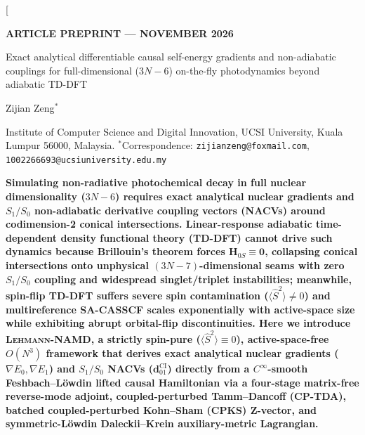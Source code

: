 \documentclass[10pt,twocolumn]{article}
\theoremstyle{natthm}
\newcommand{\leh}{\textsc{Lehmann-NAMD}}
\newcommand{\Ssq}{\langle\hat{S}^2\rangle}
\newcommand{\dCI}{\mathbf{d}_{01}^{\mathrm{CI}}}
\begin{document}
\twocolumn[{%
  \vspace*{-0.26in}
  {\sffamily\bfseries\fontsize{8}{9.5}\selectfont\color{natblue} ARTICLE \hfill PREPRINT --- NOVEMBER 2026}\par
  \vspace{6pt}
  {\sffamily\bfseries\fontsize{15.4}{19.0}\selectfont\color{natdark}\raggedright
  Exact analytical differentiable causal self-energy gradients and non-adiabatic couplings for full-dimensional ($3N{-}6$) on-the-fly photodynamics beyond adiabatic TD-DFT\par}
  \vspace{7pt}
  {\sffamily\fontsize{9.5}{11.5}\selectfont\color{natdark}
  Zijian Zeng$^{*}$\par}
  \vspace{2pt}
  {\sffamily\fontsize{7.8}{9.5}\selectfont\color{natgray}
  Institute of Computer Science and Digital Innovation, UCSI University, Kuala Lumpur 56000, Malaysia.\quad
  $^{*}$Correspondence: \texttt{zijianzeng@foxmail.com}, \texttt{1002266693@ucsiuniversity.edu.my}\par}
  \vspace{8pt}
  \noindent\colorbox{natbg}{%
    \parbox{\dimexpr\textwidth-2\fboxsep\relax}{%
      \vspace{3pt}
      \sffamily\fontsize{8.65}{11.1}\selectfont\color{natdark}\textbf{%
      Simulating non-radiative photochemical decay in full nuclear dimensionality ($3N{-}6$) requires exact analytical nuclear gradients and $S_1/S_0$ non-adiabatic derivative coupling vectors (NACVs) around codimension-2 conical intersections.
      Linear-response adiabatic time-dependent density functional theory (TD-DFT) cannot drive such dynamics because Brillouin's theorem forces $\mathbf{H}_{0S}\equiv\mathbf{0}$, collapsing conical intersections onto unphysical $(3N{-}7)$-dimensional seams with zero $S_1/S_0$ coupling and widespread singlet/triplet instabilities; meanwhile, spin-flip TD-DFT suffers severe spin contamination ($\Ssq\ne 0$) and multireference SA-CASSCF scales exponentially with active-space size while exhibiting abrupt orbital-flip discontinuities.
      Here we introduce \leh{}, a strictly spin-pure ($\Ssq\equiv 0$), active-space-free $O(N^3)$ framework that derives exact analytical nuclear gradients ($\nabla E_0, \nabla E_1$) and $S_1/S_0$ NACVs ($\dCI$) directly from a $C^\infty$-smooth Feshbach--L\"owdin lifted causal Hamiltonian via a four-stage matrix-free reverse-mode adjoint, coupled-perturbed Tamm--Dancoff (CP-TDA), batched coupled-perturbed Kohn--Sham (CPKS) Z-vector, and symmetric-L\"owdin Daleckii--Krein auxiliary-metric Lagrangian.
}}}}
\end{document}
